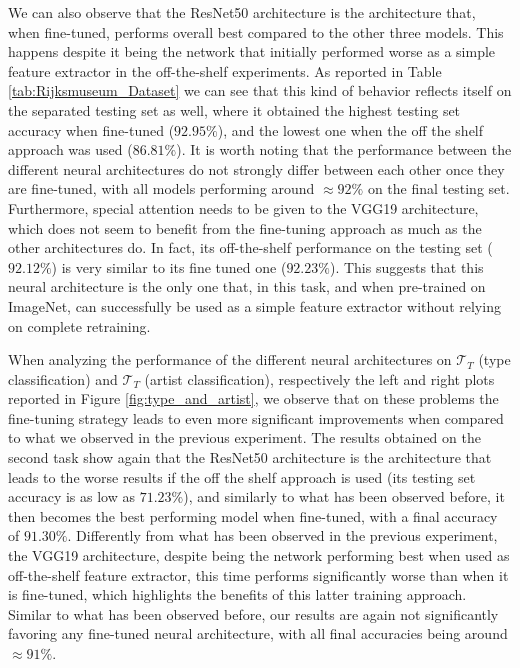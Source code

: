 We can also observe that the ResNet50 architecture is the architecture that, when fine-tuned, performs overall best compared to the other three models. This happens despite it being the network that initially performed worse as a simple feature extractor in the off-the-shelf experiments. As reported in Table \ref{tab:Rijksmuseum_Dataset} we can see that this kind of behavior reflects itself on the separated testing set as well, where it obtained the highest testing set accuracy when fine-tuned ($92.95\%$), and the lowest one when the off the shelf approach was used ($86.81\%$). It is worth noting that the performance between the different neural architectures do not strongly differ between each other once they are fine-tuned, with all models performing around $\approx 92\%$ on the final testing set. Furthermore, special attention needs to be given to the VGG19 architecture, which does not seem to benefit from the fine-tuning approach as much as the other architectures do. In fact, its off-the-shelf performance on the testing set ($92.12\%$) is very similar to its fine tuned one ($92.23\%$). This suggests that this neural architecture is the only one that, in this task, and when pre-trained on ImageNet, can successfully be used as a simple feature extractor without relying on complete retraining. 

When analyzing the performance of the different neural architectures on $\mathcal{T}_T$  (type classification) and $\mathcal{T}_T$  (artist classification), respectively the left and right plots reported in Figure \ref{fig:type_and_artist}, we observe that on these problems the fine-tuning strategy leads to even more significant improvements when compared to what we observed in the previous experiment. The results obtained on the second task show again that the ResNet50 architecture is the architecture that leads to the worse results if the off the shelf approach is used (its testing set accuracy is as low as $71.23\%$), and similarly to what has been observed before, it then becomes the best performing model when fine-tuned, with a final accuracy of $91.30\%$. Differently from what has been observed in the previous experiment, the VGG19 architecture, despite being the network performing best when used as off-the-shelf feature extractor, this time performs significantly worse than when it is fine-tuned, which highlights the benefits of this latter training approach. Similar to what has been observed before, our results are again not significantly favoring any fine-tuned neural architecture, with all final accuracies being around $\approx 91\%$.

